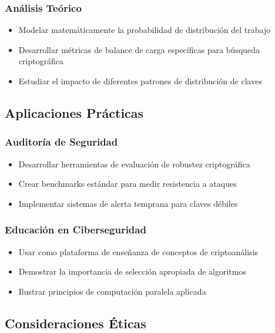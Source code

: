 \documentclass[12pt,letterpaper]{article}
\begin{document}
\subsubsection{Análisis Teórico}

\begin{itemize}
    \item Modelar matemáticamente la probabilidad de distribución del trabajo
    \item Desarrollar métricas de balance de carga específicas para búsqueda criptográfica
    \item Estudiar el impacto de diferentes patrones de distribución de claves
\end{itemize}

\subsection{Aplicaciones Prácticas}

\subsubsection{Auditoría de Seguridad}

\begin{itemize}
    \item Desarrollar herramientas de evaluación de robustez criptográfica
    \item Crear benchmarks estándar para medir resistencia a ataques
    \item Implementar sistemas de alerta temprana para claves débiles
\end{itemize}

\subsubsection{Educación en Ciberseguridad}

\begin{itemize}
    \item Usar como plataforma de enseñanza de conceptos de criptoanálisis
    \item Demostrar la importancia de selección apropiada de algoritmos
    \item Ilustrar principios de computación paralela aplicada
\end{itemize}

\subsection{Consideraciones Éticas}
\end{document}

